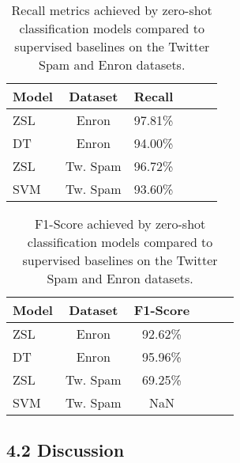 \documentclass[letterpaper,twocolumn,fleqn]{article}
\begin{document}
\begin{table}[h]
  \centering
  \begin{tabular}{|l|c|c|c|c|c|}
    \hline
    Model                                     & Dataset  & Recall  \\
    \hline
    ZSL                                       & Enron    & 97.81\% \\
    \hline
    DT\cite{shaukatCyberThreatDetection2020}  & Enron    & 94.00\% \\
    \hline
    ZSL                                       & Tw. Spam & 96.72\% \\
    \hline
    SVM\cite{shaukatCyberThreatDetection2020} & Tw. Spam & 93.60\% \\
    \hline
  \end{tabular}
  \caption{Recall metrics achieved by zero-shot classification models compared to supervised baselines on the Twitter Spam and Enron datasets.}
  \label{table:recall}
\end{table}
\begin{table}[h]
  \centering
  \begin{tabular}{|l|c|c|c|c|c|}
    \hline
    Model                                     & Dataset  & F1-Score \\
    \hline
    ZSL                                       & Enron    & 92.62\%  \\
    \hline
    DT\cite{shaukatCyberThreatDetection2020}  & Enron    & 95.96\%  \\
    \hline
    ZSL                                       & Tw. Spam & 69.25\%  \\
    \hline
    SVM\cite{shaukatCyberThreatDetection2020} & Tw. Spam & NaN      \\
    \hline
  \end{tabular}
  \caption{F1-Score achieved by zero-shot classification models compared to supervised baselines on the Twitter Spam and Enron datasets.}
  \label{table:f1-score}
\end{table}

\subsection*{4.2 Discussion}
\end{document}
